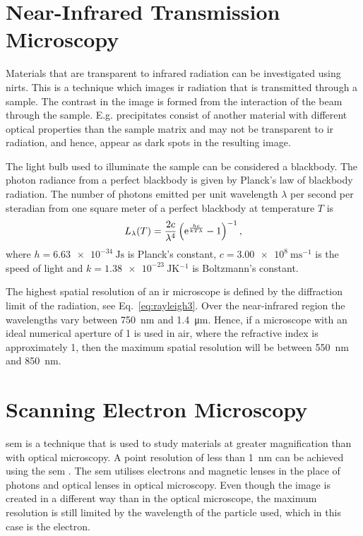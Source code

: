\section{Near-Infrared Transmission Microscopy}
%
Materials that are transparent to infrared radiation can be investigated using \acf{nirts}. This is a technique which images \ac{ir} radiation that is transmitted through a sample. The contrast in the image is formed from the interaction of the beam through the sample. E.g. precipitates consist of another material with different optical properties than the sample matrix and may not be transparent to \ac{ir} radiation, and hence, appear as dark spots in the resulting image.

The light bulb used to illuminate the sample can be considered a blackbody. The photon radiance from a perfect blackbody is given by Planck's law of blackbody radiation. The number of photons emitted per unit wavelength $\lambda$ per second per steradian from one square meter of a perfect blackbody at temperature $T$ is \citep{liboff2003introductory}
\begin{equation}\label{eq:planck-law}
L_\lambda (T) = \frac{2c}{\lambda^4}\left( \mathrm{e}^{\frac{hc}{kT\lambda}}-1 \right)^{-1},
\end{equation}
where $h=\SI{6.63e-34}{\joule\second}$ is Planck's constant, $c=\SI{3.00e8}{\metre\second^{-1}}$ is the speed of light and $k=\SI{1.38e-23}{\joule\kelvin^{-1}}$ is Boltzmann's constant.

The highest spatial resolution of an \ac{ir} microscope is defined by the diffraction limit of the radiation, see Eq.~\eqref{eq:rayleigh3}. Over the near-infrared region the wavelengths vary between \SI{750}{\nano\metre} and \SI{1.4}{\micro\metre}. Hence, if a microscope with an ideal numerical aperture of 1 is used in air, where the refractive index is approximately 1, then the maximum spatial resolution will be between \SI{550}{\nano\metre} and \SI{850}{\nano\metre}.

\section{Scanning Electron Microscopy}
\Acf{sem} is a technique that is used to study materials at greater magnification than with optical microscopy. A point resolution of less than \SI{1}{\nano\metre} can be achieved using the \ac{sem} \citep{goldstein2012scanning}. The \ac{sem} utilises electrons and magnetic lenses in the place of photons and optical lenses in optical microscopy. Even though the image is created in a different way than in the optical microscope, the maximum resolution is still limited by the wavelength of the particle used, which in this case is the electron. 

